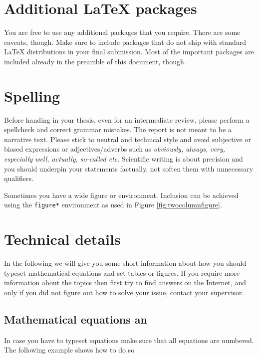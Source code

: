 \documentclass[10pt,a4paper,twoside,journal]{IEEEtran}
\begin{document}
\section{Additional \LaTeX{} packages}

You are free to use any additional packages that you require. There are some
caveats, though. Make sure to include packages that do not ship with standard
\LaTeX{} distributions in your final submission. Most of the important packages
are included already in the preamble of this document, though.


\section{Spelling}

Before handing in your thesis, even for an intermediate review, please perform a
spellcheck and correct grammar mistakes. The report is not meant to be a
narrative text. Please stick to neutral and technical style and avoid subjective
or biased expressions or adjectives/adverbs such as \emph{obviously, always,
very, especially well, actually, so-called etc}. Scientific writing is about
precision and you should underpin your statements factually, not soften them
with unnecessary qualifiers.

Sometimes you have a wide figure or environment. Inclusion can be achieved using
the \texttt{figure*} environment as used in Figure \ref{fig:twocolumnfigure}.
\begin{figure*}
	\centering
	\fbox{\rule{0pt}{2cm} \rule{1.0\linewidth}{0pt}}
	\caption{A wide figure.}
	\label{fig:twocolumnfigure}
\end{figure*}

\section{Technical details}

In the following we will give you some short information about how you should
typeset mathematical equations and set tables or figures. If you require more
information about the topics then first try to find answers on the Internet, and
only if you did not figure out how to solve your issue, contact your supervisor.

\subsection{Mathematical equations an}

In case you have to typeset equations make sure that all equations are numbered.
The following example shows how to do so
\end{document}
